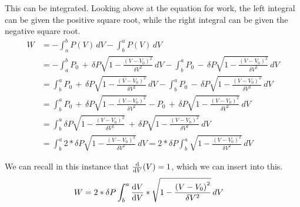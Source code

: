\documentclass[12pt]{article}
\begin{document}
            This can be integrated.
            Looking above at the equation for work, the left integral can be given the positive square root, while the right integral can be given the negative square root.
            {\footnotesize
            \begin{align}
                W   &=  -\int_{a}^{b} P(V)\,dV - \int_{b}^{a} P(V)\,dV\\
                    &=  -\int_{a}^{b} P_0\,+\, \delta P \sqrt{ 1 - \frac{\left( V - V_0 \right)^2}{\delta V^2} }\,dV - \int_{b}^{a} P_0\,-\,\delta P \sqrt{ 1 - \frac{\left( V - V_0 \right)^2}{\delta V^2} }\,dV\\
                    &=  \int_{b}^{a} P_0\,+\, \delta P \sqrt{ 1 - \frac{\left( V - V_0 \right)^2}{\delta V^2} }\,dV - \int_{b}^{a} P_0\,-\,\delta P \sqrt{ 1 - \frac{\left( V - V_0 \right)^2}{\delta V^2} }\,dV\\
                    &=  \int_{b}^{a} P_0\,+\, \delta P \sqrt{ 1 - \frac{\left( V - V_0 \right)^2}{\delta V^2} } - P_0\,+\,\delta P \sqrt{ 1 - \frac{\left( V - V_0 \right)^2}{\delta V^2} }\,dV\\
                    &=  \int_{b}^{a} \delta P \sqrt{ 1 - \frac{\left( V - V_0 \right)^2}{\delta V^2} }\,+\,\delta P \sqrt{ 1 - \frac{\left( V - V_0 \right)^2}{\delta V^2} }\,dV\\
                    &=  \int_{b}^{a} 2 * \delta P \sqrt{ 1 - \frac{\left( V - V_0 \right)^2}{\delta V^2} }\,dV
                    =   2 * \delta P \int_{b}^{a} \sqrt{ 1 - \frac{\left( V - V_0 \right)^2}{\delta V^2} }\,dV
            \end{align}}

            We can recall in this instance that $\dv{V} (V) = 1$, which we can insert into this.
            \begin{align}
                W   &=   2 * \delta P \int_{b}^{a} \dv{V}{V} * \sqrt{ 1 - \frac{\left( V - V_0 \right)^2}{\delta V^2} }\,dV
            \end{align}
\end{document}
